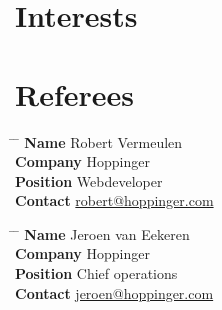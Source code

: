\documentclass[10pt]{article} %
\begin{document}

\section{Interests}



\newpage

 \section{Referees}

 \begin{tabbing}
 \hspace{2.75cm} \= \hspace{4cm} \= \kill %
 {\bf Name} \> Robert Vermeulen\\ %
 {\bf Company} \> Hoppinger \\ %
 {\bf Position} \> Webdeveloper\\ %
 {\bf Contact} \> \href{mailto:robert@hoppinger.com}{robert@hoppinger.com} %
 \end{tabbing}

 \begin{tabbing}
 \hspace{2.75cm} \= \hspace{4cm} \= \kill %
 {\bf Name} \> Jeroen van Eekeren \\ %
 {\bf Company} \> Hoppinger \\ %
 {\bf Position} \>  Chief operations \\ %
 {\bf Contact} \> \href{mailto:jeroen@hoppinger.com}{jeroen@hoppinger.com} \\ %
 \end{tabbing}

\end{document}
